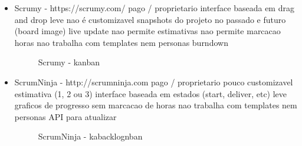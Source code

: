\begin{itemize}
\item Scrumy - https://scrumy.com/
pago / proprietario
interface baseada em drag and drop
leve
nao é customizavel
snapshots do projeto no passado e futuro (board image)
live update
nao permite estimativas
nao permite marcacao horas
nao trabalha com templates nem personas
burndown

\begin{figure}[H]
  \centering
  \caption{Scrumy - kanban}
\end{figure}

\item ScrumNinja - http://scrumninja.com
pago / proprietario
pouco customizavel
estimativa (1, 2 ou 3)
interface baseada em estados (start, deliver, etc)
leve
graficos de progresso
sem marcacao de horas
nao trabalha com templates nem personas
API para atualizar

\begin{figure}[H]
  \centering
  \caption{ScrumNinja - kabacklognban}
\end{figure}


\end{itemize}

